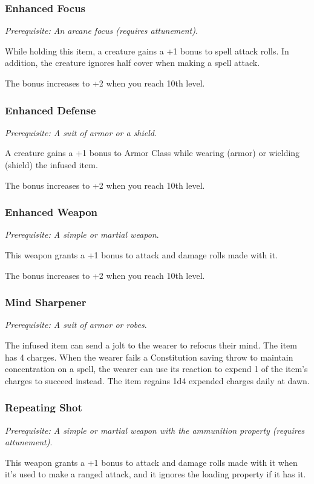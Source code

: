     \subsubsection{Enhanced Focus}
        \textit{Prerequisite: An arcane focus (requires attunement)}.

        While holding this item, a creature gains a +1 bonus to spell attack rolls. In addition, the creature ignores half cover when making a spell attack.

        The bonus increases to +2 when you reach 10th level.
    \subsubsection{Enhanced Defense}
        \textit{Prerequisite: A suit of armor or a shield}.

        A creature gains a +1 bonus to Armor Class while wearing (armor) or wielding (shield) the infused item.

        The bonus increases to +2 when you reach 10th level.
    \subsubsection{Enhanced Weapon}
        \textit{Prerequisite: A simple or martial weapon}.

        This weapon grants a +1 bonus to attack and damage rolls made with it.

        The bonus increases to +2 when you reach 10th level.
    \subsubsection{Mind Sharpener}
        \textit{Prerequisite: A suit of armor or robes}.

        The infused item can send a jolt to the wearer to refocus their mind.
        The item has 4 charges.
        When the wearer fails a Constitution saving throw to maintain concentration on a spell, the wearer can use its reaction to expend 1 of the item's charges to succeed instead.
        The item regains 1d4 expended charges daily at dawn.
    \subsubsection{Repeating Shot}
        \textit{Prerequisite: A simple or martial weapon with the ammunition property (requires attunement)}.

        This weapon grants a +1 bonus to attack and damage rolls made with it when it's used to make a ranged attack, and it ignores the loading property if it has it.


